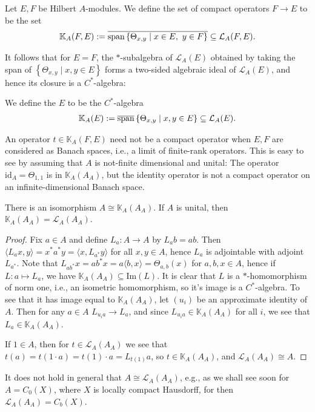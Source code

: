 \begin{definition}
	Let $E,F$ be Hilbert $A$-modules. We define the set of compact operators $F \to E$ to be the set
	\begin{align*}
		\mathbb{K}_A(F,E) := \overline{\mathrm{span}\left\{ \Theta_{x,y} \mid x \in E, \ y \in F \right\}}\subseteq \mathcal{L}_A(F,E).
	\end{align*}
\end{definition}
It follows that for $E=F$, the $*$-subalgebra of $\mathcal{L}_A(E)$ obtained by taking the span of $\left\{ \Theta_{x,y} \mid x,y \in E \right\}$ forms a two-sided algebraic ideal of $\mathcal{L}_A(E)$, and hence its closure is a $C^*$-algebra:
\begin{definition}
We define the  $E$ to be the $C^*$-algebra
	\begin{align*}
		\mathbb{K}_A(E):= \overline{\mathrm{span}}\left\{ \Theta_{x,y} \mid x,y \in E \right\} \subseteq \mathcal{L}_A(E).
	\end{align*}
\end{definition}
\begin{note}
	An operator $t \in \mathbb{K}_A(F,E)$ need not be a compact operator when $E,F$ are considered as Banach spaces, i.e., a limit of finite-rank operators. This is easy to see by assuming that $A$ is not-finite dimensional and unital: The operator $\mathrm{id}_A =\Theta_{1,1}$ is in $\mathbb{K}_A(A_A)$, but the identity operator is not a compact operator on an infinite-dimensional Banach space.
\end{note}
\begin{lemma}
	There is an isomorphism $A \cong \mathbb{K}_A(A_A)$. If $A$ is unital, then $\mathbb{K}_A(A_A) = \mathcal{L}_A(A_A)$.
	\label{mult:AisocompA}
\end{lemma}
\begin{proof}
	Fix $a \in A$ and define $L_a \colon A \to A$ by $L_ab=ab$. Then $\langle L_ax,y \rangle = x^* a^*y = \langle x, L_{a^*}y\rangle$ for all $x,y \in A$, hence $L_a$ is adjointable with adjoint $L_{a^*}$. Note that $L_{ab^*}x = ab^*x = a\langle b,x \rangle = \Theta_{a,b}(x)$ for $a,b,x \in A$, hence if $L\colon a \mapsto L_a$, we have $\mathbb{K}_A(A_A) \subseteq \mathrm{Im}(L)$. It is clear that $L$ is a $*$-homomorphism of norm one, i.e., an isometric homomorphism, so it's image is a $C^*$-algebra. To see that it has image equal to $\mathbb{K}_A(A_A)$, let $(u_i)$ be an approximate identity of $A$. Then for any $a \in A$ $L_{u_i a} \to L_{a}$, and since $L_{u_ia} \in \mathbb{K}_{A}(A_A)$ for all $i$, we see that $L_a \in \mathbb{K}_A(A_A)$.

	If $1 \in A$, then for $t \in \mathcal{L}_A(A_A)$ we see that $t(a)=t(1\cdot a)=t(1)\cdot a=L_{t(1)}a$, so $t \in \mathbb{K}_A(A_A)$, and $\mathcal{L}_A(A_A) \cong A$.
\end{proof}
\begin{note}
	It does not hold in general that $A \cong \mathcal{L}_A(A_A)$, e.g., as we shall see soon for $A=C_0(X)$, where $X$ is locally compact Hausdorff, for then $\mathcal{L}_A(A_A) = C_b(X)$.
\end{note}

